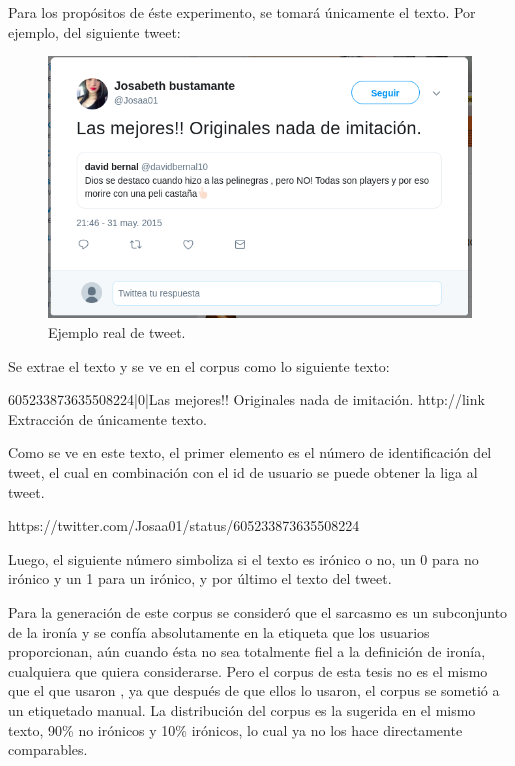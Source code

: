 \par Para los propósitos de éste experimento, se tomará únicamente el texto. Por ejemplo, del siguiente tweet:
\begin{figure}[h!]
	\centering
	\includegraphics[width=\linewidth]{imagenes/ejemploTweet.png}
	\caption{Ejemplo real de tweet.}
	\label{fig:ejTweet}
\end{figure}

\par Se extrae el texto y se ve en el corpus como lo siguiente texto:

\begin{center}
	605233873635508224|0|Las mejores!! Originales nada de imitación. http://link \\[6pt]
	\footnotesize{Extracción de únicamente texto.}
\end{center}

\par Como se ve en este texto, el primer elemento es el número de identificación del tweet, el cual en combinación con el id de usuario se puede obtener la liga al tweet.

\vspace{5pt}
\begin{center}
	\par https://twitter.com/Josaa01/status/605233873635508224
\end{center}

\vspace{5pt}
\par Luego, el siguiente número simboliza si el texto es irónico o no, un 0 para no irónico y un 1 para un irónico, y por último el texto del tweet.

\par Para la generación de este corpus se consideró que el sarcasmo es un subconjunto de la ironía y se confía absolutamente en la etiqueta que los usuarios proporcionan, aún cuando ésta no sea totalmente fiel a la definición de ironía, cualquiera que quiera considerarse. Pero el corpus de esta tesis no es el mismo que el que usaron \textcite{lopez2016character}, ya que después de que ellos lo usaron, el corpus se sometió a un etiquetado manual. La distribución del corpus es la sugerida en el mismo texto, 90\% no irónicos y 10\% irónicos, lo cual ya no los hace directamente comparables.

